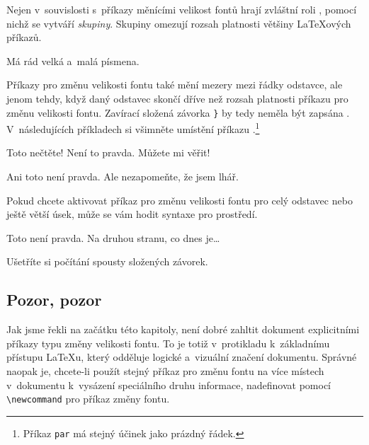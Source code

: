 Nejen v~souvislosti s~příkazy měnícími velikost fontů hrají zvláštní
roli , pomocí nichž se vytváří \emph{skupiny}. Skupiny
omezují rozsah platnosti většiny \LaTeX ových příkazů.

\begin{example}
Má rád {\LARGE velká
a~{\small malá} písmena}. 
\end{example}

Příkazy pro změnu velikosti fontu také mění mezery mezi řádky odstavce,
ale jenom tehdy, když daný odstavec skončí dříve než rozsah platnosti
příkazu pro změnu velikosti fontu. Zavírací složená závorka \verb|}|
by tedy neměla být zapsána . V~následujících příkladech
si všimněte umístění příkazu .\footnote{Příkaz \texttt{\bs{}par}
má stejný účinek jako prázdný řádek.}
 
\begin{example}
{\Large Toto nečtěte!
 Není to pravda.
 Můžete mi věřit!\par}
\end{example}

\begin{example}
{\Large Ani toto není pravda.
Ale nezapomeňte,
že jsem lhář.}\par
\end{example}

Pokud chcete aktivovat příkaz pro změnu velikosti fontu pro celý odstavec
nebo ještě větší úsek, může se vám hodit syntaxe pro prostředí.

\begin{example}
\begin{Large} 
Toto není pravda.
Na druhou stranu,
co dnes je\ldots
\end{Large}
\end{example}

\noindent Ušetříte si počítání spousty složených závorek.

\subsection{Pozor, pozor}

Jak jsme řekli na začátku této kapitoly, není dobré zahltit dokument
explicitními příkazy typu změny velikosti fontu. To je totiž v~protikladu
k~základnímu přístupu \LaTeX u, který odděluje logické a~vizuální
značení dokumentu. Správné naopak je, chcete-li použít stejný příkaz
pro změnu fontu na více místech v~dokumentu k~vysázení speciálního
druhu informace, nadefinovat pomocí \verb|\newcommand| 
pro příkaz změny fontu.


